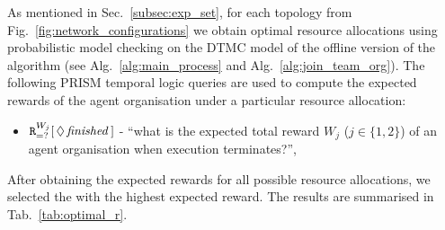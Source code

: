 \documentclass{llncs}
\begin{document}
\begin{table}
\centering
{}
\caption{Model comparison for different numbers of agents in a fully connected agent organisation for the offline version of Alg.~\ref{alg:join_team_org}.}
\label{tab:model_sizes}
\end{table}
\vspace{-20pt}
As mentioned in Sec.~\ref{subsec:exp_set}, for each topology from Fig.~\ref{fig:network_configurations} we obtain optimal resource allocations using probabilistic model checking on the DTMC model of the offline version of the algorithm (see Alg.~\ref{alg:main_process} and Alg.~\ref{alg:join_team_org}). The following PRISM temporal logic queries are used to compute the expected rewards of the agent organisation under a particular resource allocation:
\vspace{-3pt}
\begin{itemize}
 \item ${\tt R}_{=?}^{W_{j}}[\,\Diamond\,\mathit{finished}\,]$ -
``what is the expected total reward  $W_j$ ($j\in\{1,2\}$) of an agent organisation when execution terminates?'',
\end{itemize}
\vspace{-5pt}
After obtaining the expected rewards for all possible resource allocations, we selected the with the highest expected reward. The results are summarised in Tab.~\ref{tab:optimal_r}.
\end{document}
